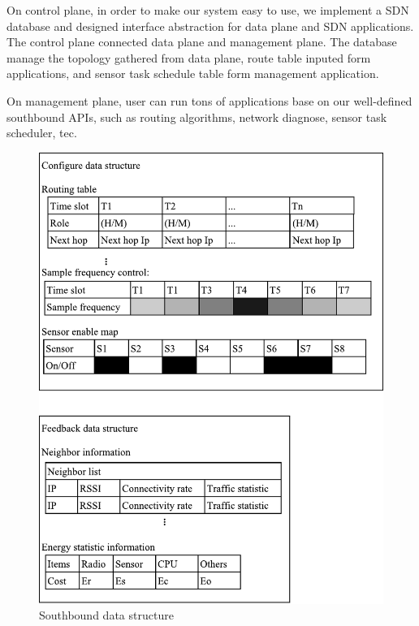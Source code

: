 On control plane, in order to make our system easy to use,  we implement a SDN database and designed interface abstraction for data plane and SDN applications. The control plane connected data plane and 
management plane. The database manage the topology gathered from data plane, route table inputed form applications, and sensor task schedule table form management application.

On management plane, user can run tons of applications base on our well-defined southbound APIs, such as routing algorithms, network diagnose, sensor task 
scheduler, tec.

\begin{figure}[htbp]
	\centering
	\includegraphics[width=1\columnwidth]{Figure/southbound-data}
	\caption{Southbound data structure}
	\label{southbound-data}
\end{figure}

